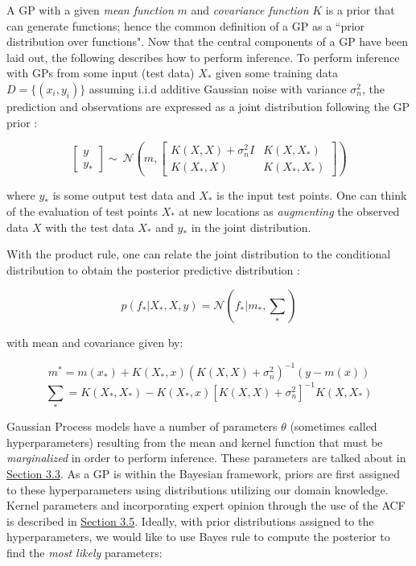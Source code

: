 A GP with a given \textit{mean function} $m$ and \textit{covariance function} $K$ is a prior that can generate functions; hence the common definition of a GP as a ``prior distribution over functions". Now that the central components of a GP have been laid out, the following describes how to perform inference. To perform inference with GPs from some input (test data) $X_*$ given some training data $D = \{(x_i, y_i)\}$ assuming i.i.d additive Gaussian noise with variance $\sigma_{n}^2$, the prediction and observations are expressed as a joint distribution following the GP prior \cite{roberts_gaussian_2013}:

\begin{equation}
\begin{bmatrix} 
y \\ 
y_*
\end{bmatrix} 
\sim{~} \mathcal{N} (m, \begin{bmatrix} 
K(X, X) + \sigma_{n}^2I & K(X, X_*) \\
K(X_*, X) & K(X_*, X_*)
\end{bmatrix})
\end{equation}

where $y_*$ is some output test data and $X_*$ is the input test points. One can think of the evaluation of test points $X_*$ at new locations as \textit{augmenting} the observed data $X$ with the test data $X_*$ and $y_*$ in the joint distribution. 

With the product rule, one can relate the joint distribution to the conditional distribution to obtain the posterior predictive distribution \cite{pml1Book}:

\begin{equation}
p(f_* | X_*, X, y) = \mathcal{N}(f_* | m_*, \sum_*)
\end{equation}

with mean and covariance given by:

\begin{equation}
m^* = m(x_*) + K(X_*, x)(K(X, X) + \sigma_{n}^2)^{-1}(y - m(x))
\end{equation}
\begin{equation}
\sum_{*} = K(X_*, X_*) - K(X_*, x)[K(X, X) + \sigma_{n}^2]^{-1}K(X, X_*)
\end{equation}

Gaussian Process models have a number of parameters $\theta$ (sometimes called hyperparameters) resulting from the mean and kernel function that must be \textit{marginalized} in order to perform inference. These parameters are talked about in \hyperlink{section.3.3}{Section 3.3}. As a GP is within the Bayesian framework, priors are first assigned to these hyperparameters using distributions utilizing our domain knowledge. Kernel parameters and incorporating expert opinion through the use of the \ac{ACF} is described in \hyperlink{subsection.3.5}{Section 3.5}. Ideally, with prior distributions assigned to the hyperparameters, we would like to use Bayes rule to compute the posterior to find the \textit{most likely} parameters:

